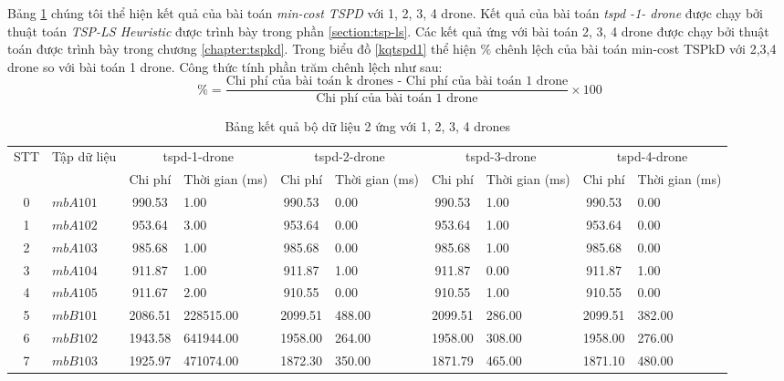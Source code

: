 \documentclass[a4paper,12pt]{report}
\begin{document}
Bảng \ref{tabletspkd1} chúng tôi thể hiện kết quả của bài toán \textit{min-cost TSPD} với 1, 2, 3, 4 drone. Kết quả của bài toán \textit{tspd -1- drone } được chạy bởi thuật toán \textit{TSP-LS Heuristic} được trình bày trong phần \ref{section:tsp-ls}. Các kết quả ứng với bài toán 2, 3, 4 drone được chạy bởi thuật toán được trình bày trong chương \ref{chapter:tspkd}. Trong biểu đồ \ref{kqtspd1} thể hiện \% chênh lệch của bài toán min-cost TSPkD với 2,3,4 drone so với bài toán 1 drone. Công thức tính phần trăm chênh lệch như sau:
$$\%=\frac{\text{Chi phí của bài toán k drones - Chi phí của bài toán 1 drone}}{\text{Chi phí của bài toán 1 drone}} \times 100$$ 
\footnotesize
\begin{longtable}{|c|l|c|p{1.5cm}|c|p{1cm}|c|p{1cm}|c|p{1cm}|}
\caption{Bảng kết quả bộ dữ liệu 2 ứng với 1, 2, 3, 4 drones}
\label{tabletspkd1}\\ 
\toprule
STT&\multirow{2}{*}{Tập dữ liệu} & \multicolumn{2}{c|}{tspd-1-drone } &\multicolumn{2}{c|}{tspd-2-drone } &\multicolumn{2}{c|}{tspd-3-drone }&\multicolumn{2}{c|}{tspd-4-drone } \\
\cline{3-10} 
&&Chi phí &Thời gian (ms)&Chi phí &Thời gian (ms)&Chi phí &Thời gian (ms)&Chi phí &Thời gian (ms)\\
\midrule
        \toprule
0&$mbA101$ &     990.53 &      1.00 &     990.53 &       0.00 &     990.53 &       1.00 &     990.53 &       0.00\\ \hline 
1&$mbA102$ &     953.64 &      3.00 &     953.64 &       0.00 &     953.64 &       1.00 &     953.64 &       0.00\\ \hline 
2&$mbA103$ &     985.68 &      1.00 &     985.68 &       0.00 &     985.68 &       1.00 &     985.68 &       0.00\\ \hline 
3&$mbA104$ &     911.87 &      1.00 &     911.87 &       1.00 &     911.87 &       0.00 &     911.87 &       1.00\\ \hline 
4&$mbA105$ &     911.67 &      2.00 &     910.55 &       0.00 &     910.55 &       1.00 &     910.55 &       0.00\\ \hline 
5&$mbB101$ &    2086.51 & 228515.00 &    2099.51 &     488.00 &    2099.51 &     286.00 &    2099.51 &     382.00\\ \hline 
6&$mbB102$ &    1943.58 & 641944.00 &    1958.00 &     264.00 &    1958.00 &     308.00 &    1958.00 &     276.00\\ \hline 
7&$mbB103$ &    1925.97 & 471074.00 &    1872.30 &     350.00 &    1871.79 &     465.00 &    1871.10 &     480.00\\ \hline 

\end{longtable}
\end{document}
